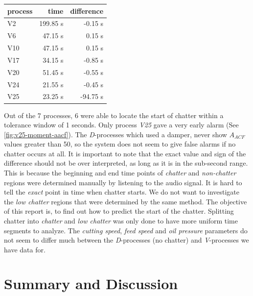 \documentclass[12 pt]{scrartcl}
\begin{document}
\begin{table}[ht]
  \centering
  \label{tab:pointdiff}
  \begin{tabular}{l|rr}
    \\
    process & time     & difference \\
    \hline
    V2      & 199.85 s & -0.15 s    \\
    V6      & 47.15 s  & 0.15 s     \\
    V10     & 47.15 s  & 0.15 s     \\
    V17     & 34.15 s  & -0.85 s    \\
    V20     & 51.45 s  & -0.55 s    \\
    V24     & 21.55 s  & -0.45 s    \\
    V25     & 23.25 s  & -94.75 s   \\
  \end{tabular}
\end{table}

Out of the 7 processes, 6 were able to locate the start of chatter within a tolerance window of 1 seconds. Only process \emph{V25} gave a very early alarm (See \ref{fig:v25-moment-aacf}). The \emph{D}-processes which used a damper, never show $A_{ACF}$ values greater than 50, so the system does not seem to give false alarms if no chatter occurs at all.
It is important to note that the exact value and sign of the difference should not be over interpreted, as long as it is in the sub-second range. This is because the beginning and end time points of \emph{chatter} and \emph{non-chatter} regions were determined manually by listening to the audio signal. It is hard to tell the \emph{exact} point in time when chatter starts. We do not want to investigate the \emph{low chatter} regions that were determined by the same method. The objective of this report is, to find out how to predict the start of the chatter. Splitting chatter into \emph{chatter} and \emph{low chatter} was only done to have more uniform time segments to analyze.
The \emph{cutting speed}, \emph{feed speed} and \emph{oil pressure} parameters do not seem to differ much between the \emph{D}-processes (no chatter) and \emph{V}-processes we have data for.

\section{Summary and Discussion}
\end{document}
